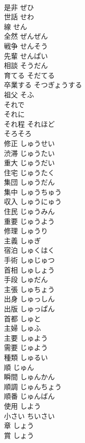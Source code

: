\documentclass[8pt]{extreport}
\begin{document}
\begin{CJK}{UTF8}{min}
\\	是非	ぜひ	
\\	世話	せわ	
\\	線	せん	
\\	全然	ぜんぜん	
\\	戦争	せんそう	
\\	先輩	せんぱい	
\\	相談	そうだん	
\\	育てる	そだてる	
\\	卒業する	そつぎょうする	
\\	祖父	そふ	
\\	それで		
\\	それに		
\\	それ程	それほど	
\\	そろそろ		
\\	修正	しゅうせい	
\\	渋滞	じゅうたい	
\\	重大	じゅうだい	
\\	住宅	じゅうたく	
\\	集団	しゅうだん	
\\	集中	しゅうちゅう	
\\	収入	しゅうにゅう	
\\	住民	じゅうみん	
\\	重要	じゅうよう	
\\	修理	しゅうり	
\\	主義	しゅぎ	
\\	宿泊	しゅくはく	
\\	手術	しゅじゅつ	
\\	首相	しゅしょう	
\\	手段	しゅだん	
\\	主張	しゅちょう	
\\	出身	しゅっしん	
\\	出版	しゅっぱん	
\\	首都	しゅと	
\\	主婦	しゅふ	
\\	主要	しゅよう	
\\	需要	じゅよう	
\\	種類	しゅるい	
\\	順	じゅん	
\\	瞬間	しゅんかん	
\\	順調	じゅんちょう	
\\	順番	じゅんばん	
\\	使用	しよう	
\\	小さい	ちいさい	
\\	章	しょう	
\\	賞	しょう	

\end{CJK}
\end{document}
